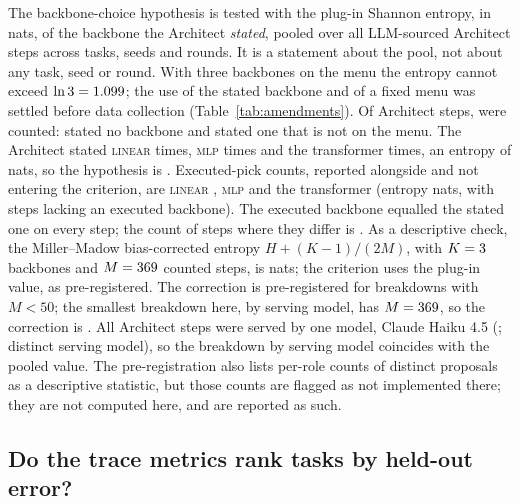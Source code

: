 The backbone-choice hypothesis is tested with the plug-in Shannon entropy, in nats, of the
backbone the Architect \emph{stated}, pooled over all LLM-sourced Architect steps across tasks,
seeds and rounds. It is a statement about the
pool, not about any task, seed or round. With three backbones on the menu the entropy cannot
exceed $\ln 3=1.099$; the use of the stated backbone and of a fixed menu was settled
before data collection (Table~\ref{tab:amendments}). Of \resHThreeNSteps{} Architect steps,
\resHThreeNCounted{} were counted: \resHThreeNMissingStated{} stated no backbone and
\resHThreeNOffMenu{} stated one that is not on the menu. The Architect stated \textsc{linear}
\resHThreePickLinear{} times, \textsc{mlp} \resHThreePickMlp{} times and the transformer
\resHThreePickScgpt{} times, an entropy of \resHThreeEntropy{} nats, so the hypothesis is
\resHThreeVerdict. Executed-pick counts, reported alongside and not entering the criterion, are
\textsc{linear} \resHThreeExecPickLinear, \textsc{mlp} \resHThreeExecPickMlp{} and the transformer
\resHThreeExecPickScgpt{} (entropy \resHThreeEntropyExecuted{} nats, with
\resHThreeNMissingExecuted{} steps lacking an executed backbone). The executed backbone
equalled the stated one on every step; the count of steps where they differ is
\resHThreeExecNeStated. As a descriptive check, the Miller--Madow bias-corrected entropy
$H+(K-1)/(2M)$, with $K=3$ backbones and $M=369$ counted steps, is
\resHThreeMillerMadowNats{} nats; the criterion uses the plug-in value, as pre-registered. The
correction is pre-registered for breakdowns with $M<50$; the smallest breakdown here, by serving
model, has $M=369$, so the correction is \resHThreeMillerMadow. All
Architect steps were served by one model, Claude Haiku 4.5 (\resRosterHaiku;
\resHThreeNModels{} distinct serving model), so the breakdown by serving model coincides with the pooled value. The pre-registration
also lists per-role counts of distinct proposals as a descriptive statistic, but those counts
are flagged as not implemented there; they are not computed here, and are reported as such.

\subsection{Do the trace metrics rank tasks by held-out error?}\label{sec:tdi-real}


